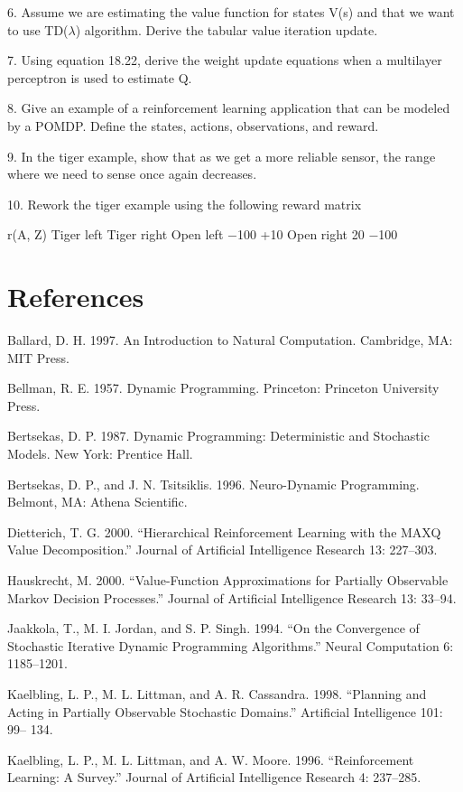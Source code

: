 6. Assume we are estimating the value function for states V(s) and that we want to use TD($\lambda$) algorithm. Derive the tabular value iteration update.

7. Using equation 18.22, derive the weight update equations when a multilayer perceptron is used to estimate Q.

8. Give an example of a reinforcement learning application that can be modeled by a POMDP. Define the states, actions, observations, and reward.

9. In the tiger example, show that as we get a more reliable sensor, the range where we need to sense once again decreases.

10. Rework the tiger example using the following reward matrix

r(A, Z) Tiger left Tiger right Open left $-$100 +10 Open right 20 $-$100

\section{References}

Ballard, D. H. 1997. An Introduction to Natural Computation. Cambridge, MA: MIT Press.

Bellman, R. E. 1957. Dynamic Programming. Princeton: Princeton University Press.

Bertsekas, D. P. 1987. Dynamic Programming: Deterministic and Stochastic Models. New York: Prentice Hall.

Bertsekas, D. P., and J. N. Tsitsiklis. 1996. Neuro-Dynamic Programming. Belmont, MA: Athena Scientific.

Dietterich, T. G. 2000. “Hierarchical Reinforcement Learning with the MAXQ Value Decomposition.” Journal of Artificial Intelligence Research 13: 227--303.

Hauskrecht, M. 2000. “Value-Function Approximations for Partially Observable Markov Decision Processes.” Journal of Artificial Intelligence Research 13: 33--94.

Jaakkola, T., M. I. Jordan, and S. P. Singh. 1994. “On the Convergence of Stochastic Iterative Dynamic Programming Algorithms.” Neural Computation 6: 1185--1201.

Kaelbling, L. P., M. L. Littman, and A. R. Cassandra. 1998. “Planning and Acting in Partially Observable Stochastic Domains.” Artificial Intelligence 101: 99-- 134.

Kaelbling, L. P., M. L. Littman, and A. W. Moore. 1996. “Reinforcement Learning: A Survey.” Journal of Artificial Intelligence Research 4: 237--285.

